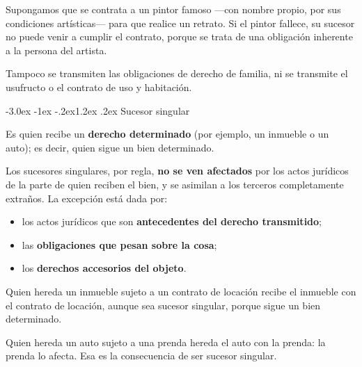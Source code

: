 \documentclass[12pt,oneside]{book}
\makeatletter
\renewcommand\section{\@startsection{section}{1}{\z@}%
  {-3.0ex \@plus -1ex \@minus -.2ex}{1.2ex \@plus .2ex}%
  {\normalfont\large\bfseries\color{acento}}}
\makeatother
\begin{document}
\begin{ejemplo}
Supongamos que se contrata a un pintor famoso ---con nombre propio, por sus condiciones artísticas--- para que realice un retrato. Si el pintor fallece, su sucesor no puede venir a cumplir el contrato, porque se trata de una obligación inherente a la persona del artista.
\end{ejemplo}

Tampoco se transmiten las obligaciones de derecho de familia, ni se transmite el usufructo o el contrato de uso y habitación.

\section{Sucesor singular}

\begin{definicion}
Es quien recibe un \textbf{derecho determinado} (por ejemplo, un inmueble o un auto); es decir, quien sigue un bien determinado.
\end{definicion}

\begin{importante}
Los sucesores singulares, por regla, \textbf{no se ven afectados} por los actos jurídicos de la parte de quien reciben el bien, y se asimilan a los terceros completamente extraños. La excepción está dada por:
\begin{itemize}
    \item los actos jurídicos que son \textbf{antecedentes del derecho transmitido};
    \item las \textbf{obligaciones que pesan sobre la cosa};
    \item los \textbf{derechos accesorios del objeto}.
\end{itemize}
\end{importante}

\begin{ejemplo}
Quien hereda un inmueble sujeto a un contrato de locación recibe el inmueble con el contrato de locación, aunque sea sucesor singular, porque sigue un bien determinado.
\end{ejemplo}

\begin{ejemplo}
Quien hereda un auto sujeto a una prenda hereda el auto con la prenda: la prenda lo afecta. Esa es la consecuencia de ser sucesor singular.
\end{ejemplo}
\end{document}
